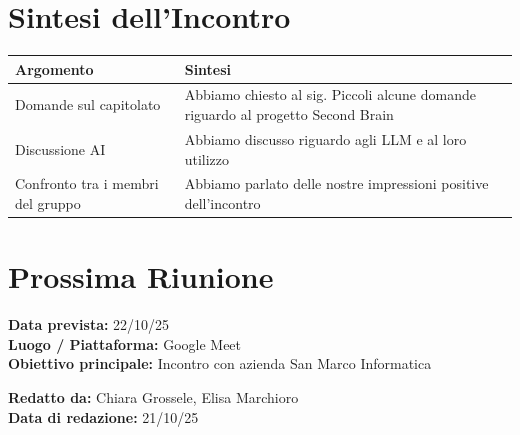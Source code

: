 \documentclass[a4paper,12pt]{article}
\begin{document}
\section*{ Sintesi dell'Incontro}

\begin{longtable}{|p{}|p{}|}
\hline
\textbf{Argomento} & \textbf{Sintesi} \\ \hline
 Domande sul capitolato & Abbiamo chiesto al sig. Piccoli alcune domande riguardo al progetto Second Brain  \\ \hline
 Discussione AI & Abbiamo discusso riguardo agli LLM e al loro utilizzo\\ \hline
 Confronto tra i membri del gruppo & Abbiamo parlato delle nostre impressioni positive dell'incontro\\ \hline
\end{longtable}

\section*{ Prossima Riunione}
\textbf{Data prevista:} 22/10/25 \\
\textbf{Luogo / Piattaforma:} Google Meet \\
\textbf{Obiettivo principale:} Incontro con azienda San Marco Informatica


\textbf{Redatto da:} Chiara Grossele, Elisa Marchioro \\
\textbf{Data di redazione:} 21/10/25
\end{document}
